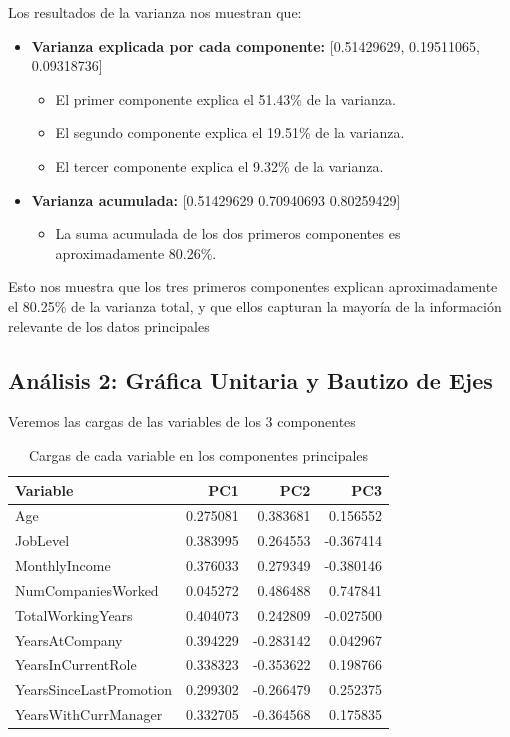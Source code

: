 Los resultados de la varianza nos muestran que:    
\begin{itemize}
    \item \textbf{Varianza explicada por cada componente:} [0.51429629, 0.19511065, 0.09318736]
    \begin{itemize}
        \item El primer componente explica el 51.43\% de la varianza.
        \item El segundo componente explica el 19.51\% de la varianza.
        \item El tercer componente explica el 9.32\% de la varianza.
    \end{itemize}

    \item \textbf{Varianza acumulada:} [0.51429629 0.70940693 0.80259429]
    \begin{itemize}
        \item La suma acumulada de los dos primeros componentes es aproximadamente 80.26\%.
    \end{itemize}
\end{itemize}

Esto nos muestra que los tres primeros componentes explican aproximadamente el 80.25\% de la varianza total,
y que ellos capturan la mayoría de la información relevante de los datos principales


\subsection{Análisis 2: Gráfica Unitaria y Bautizo de Ejes}

Veremos las cargas de las variables de los 3 componentes
\begin{table}[h!]
\centering
\begin{tabular}{|l|r|r|r|}
\hline
\textbf{Variable} & \textbf{PC1} & \textbf{PC2} & \textbf{PC3} \\ \hline
Age                       & 0.275081  & 0.383681   & 0.156552  \\ \hline
JobLevel                  & 0.383995  & 0.264553   & -0.367414 \\ \hline
MonthlyIncome             & 0.376033  & 0.279349   & -0.380146 \\ \hline
NumCompaniesWorked        & 0.045272  & 0.486488   & 0.747841  \\ \hline
TotalWorkingYears         & 0.404073  & 0.242809   & -0.027500 \\ \hline
YearsAtCompany            & 0.394229  & -0.283142  & 0.042967  \\ \hline
YearsInCurrentRole        & 0.338323  & -0.353622  & 0.198766  \\ \hline
YearsSinceLastPromotion   & 0.299302  & -0.266479  & 0.252375  \\ \hline
YearsWithCurrManager      & 0.332705  & -0.364568  & 0.175835  \\ \hline
\end{tabular}
\caption{Cargas de cada variable en los componentes principales}
\end{table}

